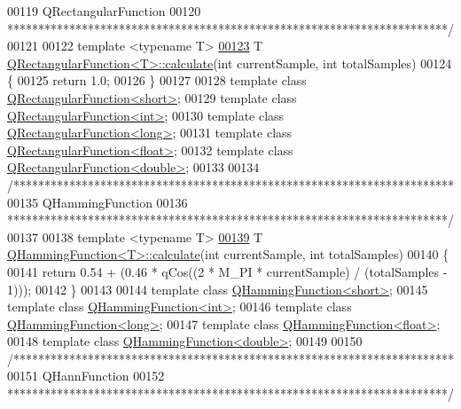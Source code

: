 \begin{DoxyCode}
00119 \textcolor{comment}{QRectangularFunction}
00120 \textcolor{comment}{***********************************************************************/}
00121 
00122 \textcolor{keyword}{template} <\textcolor{keyword}{typename} T>
\hypertarget{a00127_source_l00123}{}\hyperlink{a00062_add2d1c665e03d573a4349324acfdd0e6}{00123} T \hyperlink{a00062_add2d1c665e03d573a4349324acfdd0e6}{QRectangularFunction<T>::calculate}(\textcolor{keywordtype}{int} currentSample, \textcolor{keywordtype}{int} totalSamples)
00124 \{
00125     \textcolor{keywordflow}{return} 1.0;
00126 \}
00127 
00128 \textcolor{keyword}{template} \textcolor{keyword}{class }\hyperlink{a00062}{QRectangularFunction<short>};
00129 \textcolor{keyword}{template} \textcolor{keyword}{class }\hyperlink{a00062}{QRectangularFunction<int>};
00130 \textcolor{keyword}{template} \textcolor{keyword}{class }\hyperlink{a00062}{QRectangularFunction<long>};
00131 \textcolor{keyword}{template} \textcolor{keyword}{class }\hyperlink{a00062}{QRectangularFunction<float>};
00132 \textcolor{keyword}{template} \textcolor{keyword}{class }\hyperlink{a00062}{QRectangularFunction<double>};
00133 
00134 \textcolor{comment}{/***********************************************************************}
00135 \textcolor{comment}{QHammingFunction}
00136 \textcolor{comment}{***********************************************************************/}
00137 
00138 \textcolor{keyword}{template} <\textcolor{keyword}{typename} T>
\hypertarget{a00127_source_l00139}{}\hyperlink{a00056_a211906f8eb2b7b00b2edda7a9d0926a6}{00139} T \hyperlink{a00056_a211906f8eb2b7b00b2edda7a9d0926a6}{QHammingFunction<T>::calculate}(\textcolor{keywordtype}{int} currentSample, \textcolor{keywordtype}{int} totalSamples)
00140 \{
00141     \textcolor{keywordflow}{return} 0.54 + (0.46 * qCos((2 * M\_PI * currentSample) / (totalSamples - 1)));
00142 \}
00143 
00144 \textcolor{keyword}{template} \textcolor{keyword}{class }\hyperlink{a00056}{QHammingFunction<short>};
00145 \textcolor{keyword}{template} \textcolor{keyword}{class }\hyperlink{a00056}{QHammingFunction<int>};
00146 \textcolor{keyword}{template} \textcolor{keyword}{class }\hyperlink{a00056}{QHammingFunction<long>};
00147 \textcolor{keyword}{template} \textcolor{keyword}{class }\hyperlink{a00056}{QHammingFunction<float>};
00148 \textcolor{keyword}{template} \textcolor{keyword}{class }\hyperlink{a00056}{QHammingFunction<double>};
00149 
00150 \textcolor{comment}{/***********************************************************************}
00151 \textcolor{comment}{QHannFunction}
00152 \textcolor{comment}{***********************************************************************/}

\end{DoxyCode}
